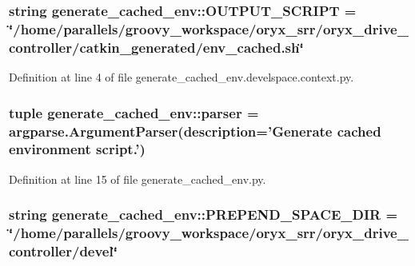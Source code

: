 \subsubsection[{\-O\-U\-T\-P\-U\-T\-\_\-\-S\-C\-R\-I\-P\-T}]{\setlength{\rightskip}{0pt plus 5cm}string {\bf generate\-\_\-cached\-\_\-env\-::\-O\-U\-T\-P\-U\-T\-\_\-\-S\-C\-R\-I\-P\-T} = \char`\"{}/home/parallels/groovy\-\_\-workspace/oryx\-\_\-srr/oryx\-\_\-drive\-\_\-controller/catkin\-\_\-generated/env\-\_\-cached.\-sh\char`\"{}}\label{namespacegenerate__cached__env_a2b990820565b508f09bdf4b646b41248}


\-Definition at line 4 of file generate\-\_\-cached\-\_\-env.\-develspace.\-context.\-py.

\subsubsection[{parser}]{\setlength{\rightskip}{0pt plus 5cm}tuple {\bf generate\-\_\-cached\-\_\-env\-::parser} = argparse.\-Argument\-Parser(description='\-Generate cached environment script.')}\label{namespacegenerate__cached__env_adc7207f2d17ca27671a8a3a61ddbe3b1}


\-Definition at line 15 of file generate\-\_\-cached\-\_\-env.\-py.

\subsubsection[{\-P\-R\-E\-P\-E\-N\-D\-\_\-\-S\-P\-A\-C\-E\-\_\-\-D\-I\-R}]{\setlength{\rightskip}{0pt plus 5cm}string {\bf generate\-\_\-cached\-\_\-env\-::\-P\-R\-E\-P\-E\-N\-D\-\_\-\-S\-P\-A\-C\-E\-\_\-\-D\-I\-R} = \char`\"{}/home/parallels/groovy\-\_\-workspace/oryx\-\_\-srr/oryx\-\_\-drive\-\_\-controller/devel\char`\"{}}\label{namespacegenerate__cached__env_adf2800a5704edaa58431a0f1c5704a4f}


